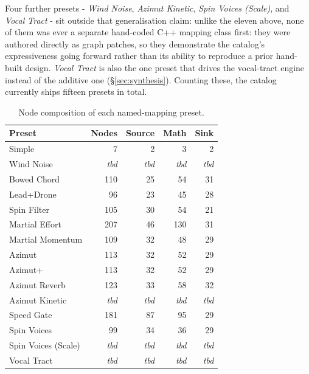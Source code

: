 \documentclass[sigconf,nonacm]{acmart}
\newcommand{\preset}[1]{\textit{#1}}
\begin{document}
Four further presets - \preset{Wind Noise}, \preset{Azimut Kinetic}, \preset{Spin Voices (Scale)}, and
\preset{Vocal Tract} - sit outside that generalisation claim: unlike the eleven above, none of them
was ever a separate hand-coded C++ mapping class first: they were authored directly as graph
patches, so they demonstrate the catalog's expressiveness going forward rather than its ability to
reproduce a prior hand-built design. \preset{Vocal Tract} is also the one preset that drives the
vocal-tract engine instead of the additive one (\S\ref{sec:synthesis}). Counting these, the catalog
currently ships fifteen presets in total.
\begin{table}[htbp]
\centering
\small
\caption{Node composition of each named-mapping preset.}
\label{tab:preset-nodes}
\begin{tabular}{@{}lrrrr@{}}
\toprule
Preset & Nodes & Source & Math & Sink \\
\midrule
Simple         & 7  & 2 & 3   & 2 \\
Wind Noise     & \textit{tbd} & \textit{tbd} & \textit{tbd} & \textit{tbd} \\
Bowed Chord    & 110 & 25 & 54  & 31 \\
Lead+Drone     & 96 & 23 & 45  & 28 \\
Spin Filter    & 105 & 30 & 54  & 21 \\
Martial Effort   & 207 & 46 & 130 & 31 \\
Martial Momentum & 109 & 32 & 48  & 29 \\
Azimut         & 113 & 32 & 52  & 29 \\
Azimut+        & 113 & 32 & 52  & 29 \\
Azimut Reverb  & 123 & 33 & 58  & 32 \\
Azimut Kinetic & \textit{tbd} & \textit{tbd} & \textit{tbd} & \textit{tbd} \\
Speed Gate       & 181 & 87 & 95 & 29 \\
Spin Voices      & 99 & 34 & 36  & 29 \\
Spin Voices (Scale) & \textit{tbd} & \textit{tbd} & \textit{tbd} & \textit{tbd} \\
Vocal Tract    & \textit{tbd} & \textit{tbd} & \textit{tbd} & \textit{tbd} \\
\bottomrule
\end{tabular}
\end{table}
\end{document}
